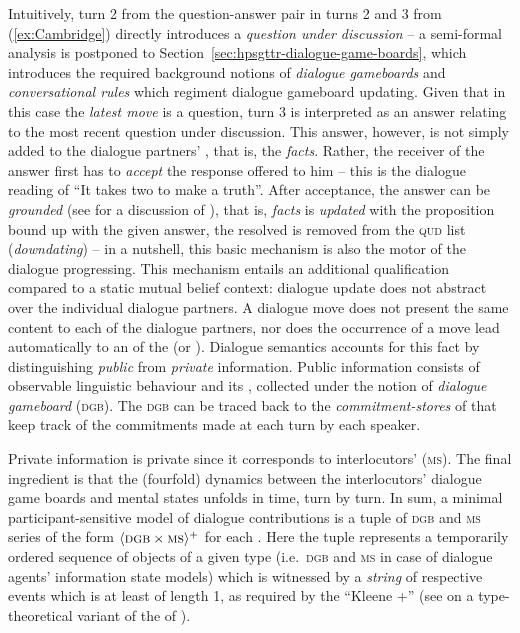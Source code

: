 \documentclass[output=paper
 	        ,biblatex
                ,babelshorthands
                ,newtxmath
                ,draftmode
                ,colorlinks, citecolor=brown
]{langscibook}
\begin{document}
Intuitively, turn 2 from the question-answer pair in turns 2 and 3 from (\ref{ex:Cambridge}) directly introduces a \emph{question under discussion} -- a semi-formal analysis is postponed to Section~\ref{sec:hpsgttr-dialogue-game-boards}, which introduces the required background notions of \emph{dialogue gameboards} and \emph{conversational rules} which regiment dialogue gameboard updating.
%
Given that in this case the \emph{latest move} is a question, turn 3 is interpreted as an answer relating to the most recent question under discussion.
%
This answer, however, is not simply added to the dialogue partners' , that is, the \emph{facts}.
%
Rather, the receiver of the answer first has to \emph{accept} the response offered to him -- this is the dialogue reading of \enquote{It takes two to make a truth}.
%
After acceptance, the answer can be \emph{grounded} (see \citealt[Chapter~4]{Clark:1996} for a discussion of ), that is, \emph{facts} is \emph{updated} with the proposition bound up with the given answer, the resolved  is removed from the \textsc{qud} list (\emph{downdating}) -- in a nutshell, this basic mechanism is also the motor of the dialogue progressing.
%
This mechanism entails an additional qualification compared to a static mutual belief context: dialogue update does not abstract over the individual dialogue partners.
%
A dialogue move does not present the same content to each of the dialogue partners, nor does the occurrence of a move lead automatically to an  of the  (or ).
%
Dialogue semantics accounts for this fact by distinguishing \emph{public} from \emph{private} information. 
%
Public information consists of observable linguistic behaviour and its , collected under the notion of \emph{dialogue gameboard} (\textsc{dgb}). 
%
The \textsc{dgb} can be traced back to the \emph{commitment-stores} of \citet{Hamblin:1970} that keep track of the commitments made at each turn by each speaker. 

Private information is private since it corresponds to interlocutors'  (\textsc{ms}).
%
The final ingredient is that the (fourfold) dynamics between the interlocutors' dialogue game boards and mental states unfolds in time, turn by turn.
%
In sum, a minimal participant-sensitive model of dialogue contributions is a tuple of \textsc{dgb} and \textsc{ms} series of the form $\langle \textsc{dgb} \times \textsc{ms} \rangle^+$ for each . 
%
Here the tuple represents a temporarily ordered sequence of objects of a given type (i.e.\ \textsc{dgb} and \textsc{ms} in case of dialogue agents' information state models) which is witnessed by a \emph{string} of respective events which is at least of length 1, as required by the \enquote{Kleene +}\is{+}  (see \citealt[Section~2.7]{Cooper:Ginzburg:2015} on a type-theoretical variant of the  of \citealt{Fernando:2011}).
\end{document}
